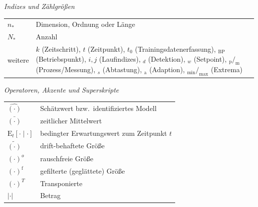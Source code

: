 \noindent\textit{Indizes und Zählgrößen}
\begin{longtable}{@{}p{}p{}@{}}
    $n_{\ast}$ & Dimension, Ordnung oder Länge
    \\
    $N_{\ast}$ & Anzahl
    \\
    weitere    & $k$ (Zeitschritt), $t$ (Zeitpunkt), $t_0$ (Trainingsdatenerfassung), $_{\mathrm{BP}}$ (Betriebspunkt), $i, j$ (Laufindizes), $_d$ (Detektion), $_w$ (Setpoint), $_{\mathrm{p}}/_{\mathrm{m}}$ (Prozess/Messung), $_s$ (Abtastung), $_{\mathrm{a}}$ (Adaption), $_{\min}/_{\max}$ (Extrema) \\
\end{longtable}

\noindent\textit{Operatoren, Akzente und Superskripte}
\begin{longtable}{@{}p{}p{}@{}}
    $\hat{(\cdot)}$         & Schätzwert bzw.\ identifiziertes Modell \\
    $\bar{(\cdot)}$         & zeitlicher Mittelwert \\
    $\mathrm{E}_t[\cdot \mid \cdot]$ & bedingter Erwartungswert zum Zeitpunkt $t$ \\
    $\tilde{(\cdot)}$       & drift-behaftete Größe \\
    $(\cdot)^o$            & rauschfreie Größe \\
    $(\cdot)^{\mathrm{f}}$ & gefilterte (geglättete) Größe \\
    $(\cdot)^{T}$          & Transponierte \\
    $|\cdot|$              & Betrag \\
\end{longtable}

